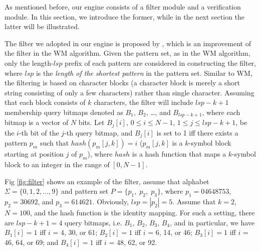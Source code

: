 \documentclass{article}
\begin{document}
As mentioned before, our engine consists of a filter module and a
verification module. In this section, we introduce the former, while
in the next section the latter will be illustrated.

The filter we adopted in our engine is proposed by \cite{Lee2013},
which is an improvement of the filter in the WM algorithm. Given the
pattern set, as in the WM algorithm, only the length-$lsp$ prefix of
each pattern are considered in constructing the filter, where $lsp$ is
the \emph{length of the shortest pattern} in the pattern set. Similar
to WM, the filtering is based on character blocks (a character block
is merely a short string consisting of only a few characters) rather
than single character. Assuming that each block consists of $k$
characters, the filter will include $lsp-k+1$ membership query bitmaps
denoted as $B_1$, $B_2$, \dots, and $B_{lsp-k+1}$, where each bitmap
is a vector of $N$ bits. Let $B_j[i]$, $0 \leq i \leq N - 1$,
$1 \leq j \leq lsp-k+1$, be the $i$-th bit of the $j$-th query bitmap,
and $B_j[i]$ is set to 1 iff there exists a pattern $p_m$ such that
$hash(p_m[j,k]) = i$ ($p_m[j,k]$ is a $k$-symbol block starting at
position $j$ of $p_m$), where $hash$ is a hash function that maps a
$k$-symbol block to an integer in the range of $[0, N-1]$.


Fig \ref{fig:filter} shows an example of the filter, assume that
alphabet $\Sigma = \{0, 1, 2, \dots, 9\}$ and pattern set
$P = \{p_1,\; p_2,\; p_3\}$, where $p_1 = 04648753$, $p_2 = 30692$,
and $p_3 = 614621$.  Obviously, $lsp = |p_2|= 5$. Assume that $k = 2$,
$N = 100$, and the hash function is the identity mapping. For such a
setting, there are $lsp - k + 1 = 4$ query bitmaps, i.e. $B_1$, $B_2$,
$B_3$, $B_4$, and in particular, we have $B_1[i] = 1$ iff $i$ = 4, 30,
or 61; $B_2[i] = 1$ iff $i$ = 6, 14, or 46; $B_3[i] = 1$ iff $i$ = 46,
64, or 69; and $B_4[i] = 1$ iff $i$ = 48, 62, or 92.
\end{document}
